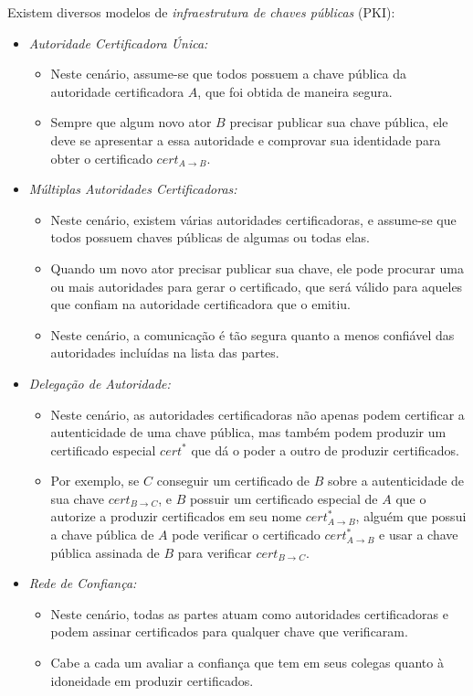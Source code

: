 Existem diversos modelos de {\em infraestrutura de chaves públicas} (PKI):

\begin{itemize}
\item {\em Autoridade Certificadora Única:}
  \begin{itemize}
  \item Neste cenário, assume-se que todos possuem a chave pública da autoridade certificadora $A$, que foi obtida de maneira segura.
  \item Sempre que algum novo ator $B$ precisar publicar sua chave pública, ele deve se apresentar a essa autoridade e comprovar sua identidade para obter o certificado $cert_{A \to B}$.
  \end{itemize}
    
\item {\em Múltiplas Autoridades Certificadoras:}
  \begin{itemize}
  \item Neste cenário, existem várias autoridades certificadoras, e assume-se que todos possuem chaves públicas de algumas ou todas elas.
  \item Quando um novo ator precisar publicar sua chave, ele pode procurar uma ou mais autoridades para gerar o certificado, que será válido para aqueles que confiam na autoridade certificadora que o emitiu.
  \item Neste cenário, a comunicação é tão segura quanto a menos confiável das autoridades incluídas na lista das partes.
  \end{itemize}
    
\item {\em Delegação de Autoridade:}
  \begin{itemize}
  \item Neste cenário, as autoridades certificadoras não apenas podem certificar a autenticidade de uma chave pública, mas também podem produzir um certificado especial $cert^*$ que dá o poder a outro de produzir certificados.
  \item Por exemplo, se $C$ conseguir um certificado de $B$ sobre a autenticidade de sua chave $cert_{B \to C}$, e $B$ possuir um certificado especial de $A$ que o autorize a produzir certificados em seu nome $cert^*_{A \to B}$, alguém que possui a chave pública de $A$ pode verificar o certificado $cert^*_{A \to B}$ e usar a chave pública assinada de $B$ para verificar $cert_{B \to C}$.
  \end{itemize}
    
\item {\em Rede de Confiança:}
  \begin{itemize}
  \item Neste cenário, todas as partes atuam como autoridades certificadoras e podem assinar certificados para qualquer chave que verificaram.
  \item Cabe a cada um avaliar a confiança que tem em seus colegas quanto à idoneidade em produzir certificados.
  \end{itemize}
\end{itemize}

